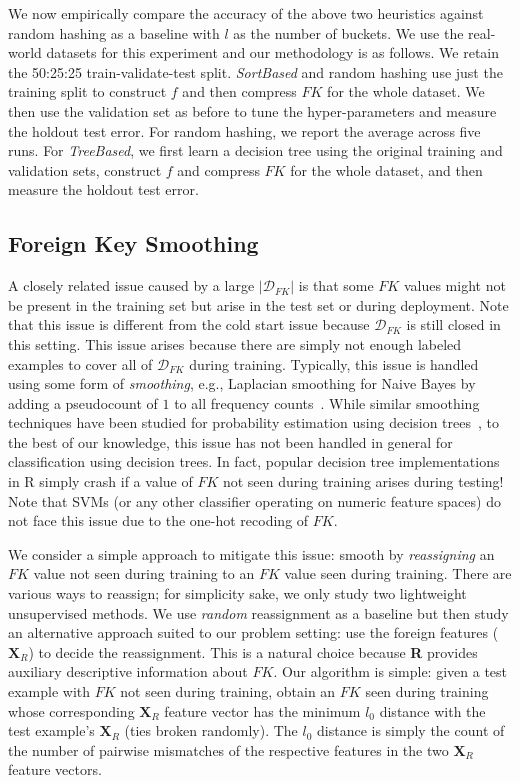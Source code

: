 \documentclass[sigconf]{acmart}
\begin{document}
We now empirically compare the accuracy of the above two heuristics against random hashing as a baseline with $l$ as the number of buckets. 
We use the real-world datasets for this experiment and our methodology is as follows. We retain the 50:25:25 train-validate-test split.
\textit{SortBased} and random hashing use just the training split to construct $f$ and then compress $FK$ for the whole dataset. We then use
the validation set as before to tune the hyper-parameters and measure the holdout test error. For random hashing, we report the average across 
five runs. For \textit{TreeBased}, we first learn a decision tree using the original training and validation sets, construct $f$ and compress 
$FK$ for the whole dataset, and then measure the holdout test error.


\subsection{Foreign Key Smoothing}

A closely related issue caused by a large $|\mathcal{D}_{FK}|$ is that some $FK$ values might not be present in the training set but arise 
in the test set or during deployment. Note that this issue is different from the cold start issue because $\mathcal{D}_{FK}$ is still closed 
in this setting. This issue arises because there are simply not enough labeled examples to cover 
all of $\mathcal{D}_{FK}$ during training. Typically, this issue is handled using some form of \textit{smoothing}, e.g., Laplacian smoothing
for Naive Bayes by adding a pseudocount of $1$ to all frequency counts~\cite{mitchellbook}.
While similar smoothing techniques have been studied for probability estimation using decision trees~\cite{pedro2003}, to the best of our knowledge, 
this issue has not been handled in general for classification using decision trees. In fact, popular decision tree implementations in R simply 
crash if a value of $FK$ not seen during training arises during testing! Note that SVMs (or any other classifier operating on numeric 
feature spaces) do not face this issue due to the one-hot recoding of $FK$. 

We consider a simple approach to mitigate this issue: smooth by \textit{reassigning} an $FK$ value not seen during training to an $FK$ value 
seen during training. There are various ways to reassign; for simplicity sake, we only study two lightweight unsupervised methods. 
We use \textit{random} reassignment as a baseline but then study an alternative approach suited to our problem setting: use the foreign features 
($\textbf{X}_R$) to decide the reassignment. This is a natural choice because \textbf{R} provides auxiliary descriptive information about $FK$.
Our algorithm is simple: given a test example with $FK$ not seen during training, obtain an $FK$ seen during training whose corresponding 
$\textbf{X}_R$ feature vector has the minimum $l_0$ distance with the test example's $\textbf{X}_R$ (ties broken randomly). The $l_0$ distance is
simply the count of the number of pairwise mismatches of the respective features in the two $\textbf{X}_R$ feature vectors. 
\end{document}
